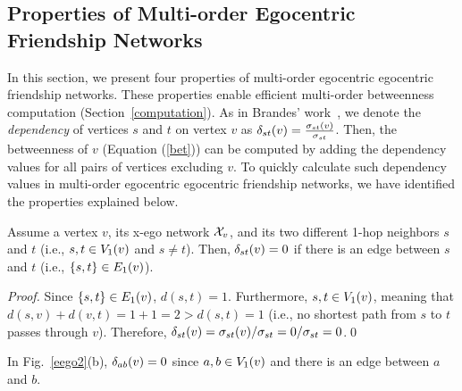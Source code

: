 \subsection{Properties of Multi-order Egocentric Friendship Networks}\label{mfn_properties}
In this section, we present four properties of multi-order egocentric egocentric friendship networks. 
These properties enable efficient multi-order betweenness computation (Section~\ref{computation}). 
As in Brandes' work~\cite{Brandes01afaster}, we denote the \emph{dependency} of vertices $s$ and $t$ on vertex $v$ as $\D{s}{t}{v} = \frac{\sigma_{st}(v)}{\sigma_{st}}$.
Then, the betweenness of $v$ (Equation (\ref{bet})) can be computed by adding the dependency values for all pairs of vertices excluding $v$.
To quickly calculate such dependency values in multi-order egocentric egocentric friendship networks, we have identified the properties explained below. 
\begin{theorem}
\label{theorem1} 
Assume a vertex $v$, its x-ego network $\XN{v}$, and its two different 1-hop neighbors $s$ and $t$ (i.e., $s, t \in \V{v}{1}$ and $s \ne t$).
Then, $\D{s}{t}{v} = 0$ if there is an edge between $s$ and $t$ (i.e., $\{s, t\} \in \E{v}{1}$).
\begin{proof}
Since $\{s, t\} \in \E{v}{1}$, $d(s, t) = 1$.
Furthermore, $s, t \in \V{v}{1}$, meaning that $d(s, v) + d(v, t) = 1 + 1 = 2 > d(s, t) = 1$ (i.e., no shortest path from $s$ to $t$ passes through $v$).
Therefore, $\D{s}{t}{v} = \sigma_{st}(v)/\sigma_{st} = 0/\sigma_{st} = 0$.\hfill\qed
\end{proof}
\end{theorem}
\begin{example}
In Fig.~\ref{eego2}(b), $\D{a}{b}{v} = 0$ since $a, b \in \V{v}{1}$ and there is an edge between $a$ and $b$.
\end{example}
